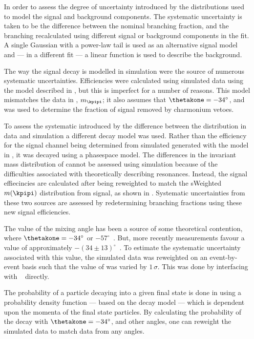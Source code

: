 In order to assess the degree of uncertainty introduced by the distributions used to model the
signal and background components.
The systematic uncertainty is taken to be the difference between the nominal branching fraction,
and the branching recalculated using different signal or background components in the fit.
A single Gaussian with a power-law tail is used as an alternative signal model and --- in a
different fit --- a linear function is used to describe the background.

The way the signal decay is modelled in simulation were the source of numerous systematic
uncertainties.
Efficiencies were calculated using simulated data using the model described in
, but this is imperfect for a number of reasons.
This model mismatches the data in \qsq, $m_\kpipi$; it also assumes that $\thetakone=-34^\circ$,
and was used to determine the fraction of signal removed by charmonium vetoes.

To assess the systematic introduced by the difference between the \qsq distribution in data and
simulation a different decay model was used.
Rather than the efficiency for the signal channel being determined from simulated
 generated with the model in , it was decayed
using a phasespace model.
The differences in the invariant mass distribution of \kpipi cannot be assessed using simulation
because of the difficulties associated with theoretically describing \kpipi resonances.
Instead, the signal effiecincies are calculated after being reweighted to match the sWeighted
$m(\kpipi)$ distribution from signal, as shown in .
Systematic uncertainties from these two sources are assessed by redetermining branching fractions
using these new signal efficiencies.

The value of the mixing angle \thetakone has been a source of some theoretical contention, where
$\thetakone=-34^\circ$ or
$-57^\circ$~\cite{PhysRevD.47.1252,Tayduganov:2011ui,Hatanaka:2008xj,Cheng:2011pb,Divotgey:2013jba,Cheng:2013cwa}.
But, more recently measurements favour a value of approximately
$-(34\pm13)^\circ$~\cite{Hatanaka:2008xj,Cheng:2011pb,Divotgey:2013jba,Cheng:2013cwa}.
To estimate the systematic uncertainty associated with this value, the simulated data was
reweighted on an event-by-event basis such that the value of \thetakone was varied by $1\,\sigma$.
This was done by interfacing with \evtgen~\cite{Lange:2001uf} directly.

The probability of a particle decaying into a given final state is done in \evtgen using
a probability density function --- based on the decay model --- which is
dependent upon the momenta of the final state particles.
By calculating the probability of the decay with $\thetakone=-34^\circ$, and other angles, one can
reweight the simulated data to match data from any angles.

